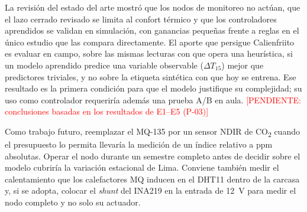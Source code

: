 \documentclass[manuscript,screen,nonacm,natbib=false]{acmart}
\newcommand{\pendiente}[1]{\textcolor{red}{[PENDIENTE: #1]}}
\newcommand{\COdos}{CO\textsubscript{2}}
\begin{document}
La revisión del estado del arte mostró que los nodos de monitoreo no actúan, que el lazo cerrado revisado se limita al confort térmico y que los controladores aprendidos se validan en simulación, con ganancias pequeñas frente a reglas en el único estudio que las compara directamente. El aporte que persigue Calienfriito es evaluar en campo, sobre las mismas lecturas con que opera una heurística, si un modelo aprendido predice una variable observable ($\Delta T_{15}$) mejor que predictores triviales, y no sobre la etiqueta sintética con que hoy se entrena. Ese resultado es la primera condición para que el modelo justifique su complejidad; su uso como controlador requeriría además una prueba A/B en aula. \pendiente{conclusiones basadas en los resultados de E1--E5 (P-03)}

Como trabajo futuro, reemplazar el MQ-135 por un sensor NDIR de \COdos{} cuando el presupuesto lo permita llevaría la medición de un índice relativo a ppm absolutas. Operar el nodo durante un semestre completo antes de decidir sobre el modelo cubriría la variación estacional de Lima. Conviene también medir el calentamiento que los calefactores MQ inducen en el DHT11 dentro de la carcasa y, si se adopta, colocar el \textit{shunt} del INA219 en la entrada de 12~V para medir el nodo completo y no solo su actuador.

\FloatBarrier


\end{document}
